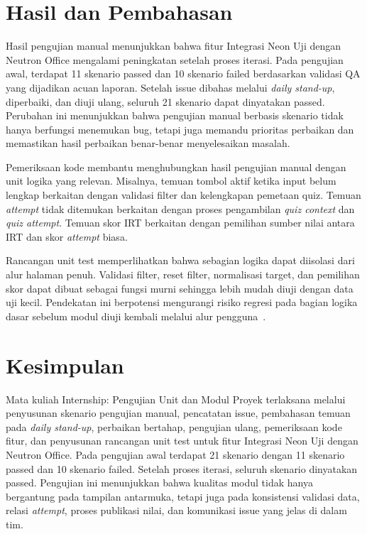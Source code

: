 \section{Hasil dan Pembahasan}
Hasil pengujian manual menunjukkan bahwa fitur Integrasi Neon Uji dengan Neutron Office mengalami peningkatan setelah proses iterasi. Pada pengujian awal, terdapat 11 skenario passed dan 10 skenario failed berdasarkan validasi QA yang dijadikan acuan laporan. Setelah issue dibahas melalui \textit{daily stand-up}, diperbaiki, dan diuji ulang, seluruh 21 skenario dapat dinyatakan passed. Perubahan ini menunjukkan bahwa pengujian manual berbasis skenario tidak hanya berfungsi menemukan bug, tetapi juga memandu prioritas perbaikan dan memastikan hasil perbaikan benar-benar menyelesaikan masalah.

Pemeriksaan kode membantu menghubungkan hasil pengujian manual dengan unit logika yang relevan. Misalnya, temuan tombol aktif ketika input belum lengkap berkaitan dengan validasi filter dan kelengkapan pemetaan quiz. Temuan \textit{attempt} tidak ditemukan berkaitan dengan proses pengambilan \textit{quiz context} dan \textit{quiz attempt}. Temuan skor IRT berkaitan dengan pemilihan sumber nilai antara  IRT dan skor \textit{attempt} biasa.

Rancangan unit test memperlihatkan bahwa sebagian logika dapat diisolasi dari alur halaman penuh. Validasi filter, reset filter, normalisasi target, dan pemilihan skor dapat dibuat sebagai fungsi murni sehingga lebih mudah diuji dengan data uji kecil. Pendekatan ini berpotensi mengurangi risiko regresi pada bagian logika dasar sebelum modul diuji kembali melalui alur pengguna~\cite{pendidikan_useImportNeonUji_helpers,pendidikan_useImportNeonUji_test}.

\section{Kesimpulan}
Mata kuliah Internship: Pengujian Unit dan Modul Proyek terlaksana melalui penyusunan skenario pengujian manual, pencatatan issue, pembahasan temuan pada \textit{daily stand-up}, perbaikan bertahap, pengujian ulang, pemeriksaan kode fitur, dan penyusunan rancangan unit test untuk fitur Integrasi Neon Uji dengan Neutron Office. Pada pengujian awal terdapat 21 skenario dengan 11 skenario passed dan 10 skenario failed. Setelah proses iterasi, seluruh skenario dinyatakan passed. Pengujian ini menunjukkan bahwa kualitas modul tidak hanya bergantung pada tampilan antarmuka, tetapi juga pada konsistensi validasi data, relasi \textit{attempt}, proses publikasi nilai, dan komunikasi issue yang jelas di dalam tim.
